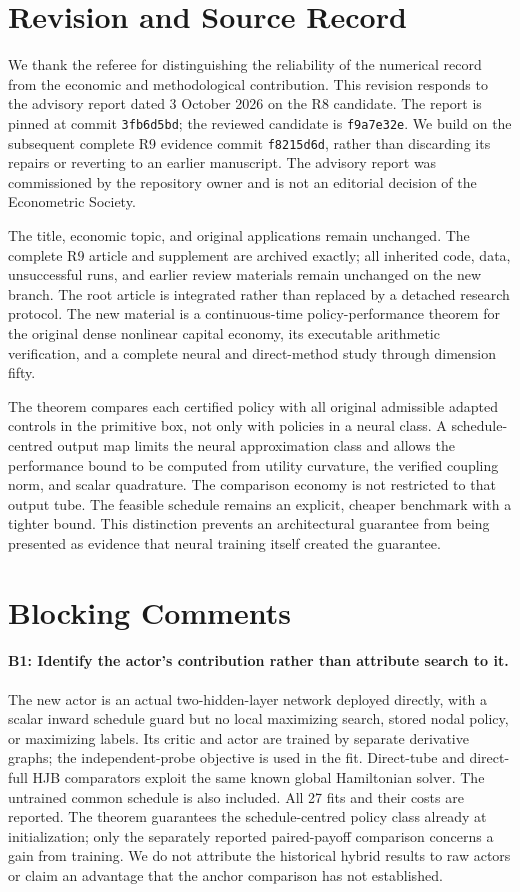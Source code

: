 \section{Revision and Source Record}
We thank the referee for distinguishing the reliability of the numerical record from the economic and methodological contribution. This revision responds to the advisory report dated 3 October 2026 on the R8 candidate. The report is pinned at commit \texttt{3fb6d5bd}; the reviewed candidate is \texttt{f9a7e32e}. We build on the subsequent complete R9 evidence commit \texttt{f8215d6d}, rather than discarding its repairs or reverting to an earlier manuscript. The advisory report was commissioned by the repository owner and is not an editorial decision of the Econometric Society.

The title, economic topic, and original applications remain unchanged. The complete R9 article and supplement are archived exactly; all inherited code, data, unsuccessful runs, and earlier review materials remain unchanged on the new branch. The root article is integrated rather than replaced by a detached research protocol. The new material is a continuous-time policy-performance theorem for the original dense nonlinear capital economy, its executable arithmetic verification, and a complete neural and direct-method study through dimension fifty.

The theorem compares each certified policy with all original admissible adapted controls in the primitive box, not only with policies in a neural class. A schedule-centred output map limits the neural approximation class and allows the performance bound to be computed from utility curvature, the verified coupling norm, and scalar quadrature. The comparison economy is not restricted to that output tube. The feasible schedule remains an explicit, cheaper benchmark with a tighter bound. This distinction prevents an architectural guarantee from being presented as evidence that neural training itself created the guarantee.

\section{Blocking Comments}
\paragraph{B1: Identify the actor's contribution rather than attribute search to it.}
The new actor is an actual two-hidden-layer network deployed directly, with a scalar inward schedule guard but no local maximizing search, stored nodal policy, or maximizing labels. Its critic and actor are trained by separate derivative graphs; the independent-probe objective is used in the fit. Direct-tube and direct-full HJB comparators exploit the same known global Hamiltonian solver. The untrained common schedule is also included. All 27 fits and their costs are reported. The theorem guarantees the schedule-centred policy class already at initialization; only the separately reported paired-payoff comparison concerns a gain from training. We do not attribute the historical hybrid results to raw actors or claim an advantage that the anchor comparison has not established.

